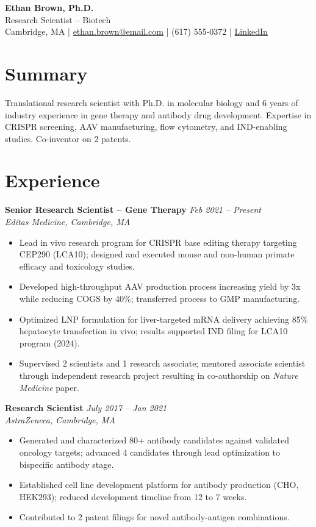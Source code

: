 \documentclass[11pt,a4paper]{article}
\begin{document}
\begin{center}
  {\LARGE \textbf{Ethan Brown, Ph.D.}}\\[3pt]
  {\large \textcolor{accent}{Research Scientist -- Biotech}}\\[4pt]
  Cambridge, MA \quad|\quad
  \href{mailto:ethan.brown@email.com}{ethan.brown@email.com} \quad|\quad
  (617) 555-0372 \quad|\quad
  \href{https://linkedin.com/in/ethanbrown-biotech}{LinkedIn}
\end{center}

\section{Summary}
Translational research scientist with Ph.D. in molecular biology and 6 years of industry experience in gene therapy and antibody drug development. Expertise in CRISPR screening, AAV manufacturing, flow cytometry, and IND-enabling studies. Co-inventor on 2 patents.

\section{Experience}

\noindent\textbf{Senior Research Scientist -- Gene Therapy} \hfill \textit{Feb 2021 -- Present}\\
\textit{Editas Medicine, Cambridge, MA}
\begin{itemize}
  \item Lead in vivo research program for CRISPR base editing therapy targeting CEP290 (LCA10); designed and executed mouse and non-human primate efficacy and toxicology studies.
  \item Developed high-throughput AAV production process increasing yield by 3x while reducing COGS by 40\%; transferred process to GMP manufacturing.
  \item Optimized LNP formulation for liver-targeted mRNA delivery achieving 85\% hepatocyte transfection in vivo; results supported IND filing for LCA10 program (2024).
  \item Supervised 2 scientists and 1 research associate; mentored associate scientist through independent research project resulting in co-authorship on \textit{Nature Medicine} paper.
\end{itemize}

\vspace{4pt}
\noindent\textbf{Research Scientist} \hfill \textit{July 2017 -- Jan 2021}\\
\textit{AstraZeneca, Cambridge, MA}
\begin{itemize}
  \item Generated and characterized 80+ antibody candidates against validated oncology targets; advanced 4 candidates through lead optimization to bispecific antibody stage.
  \item Established cell line development platform for antibody production (CHO, HEK293); reduced development timeline from 12 to 7 weeks.
  \item Contributed to 2 patent filings for novel antibody-antigen combinations.
\end{itemize}
\end{document}
